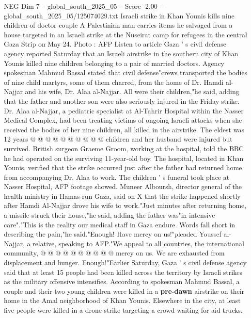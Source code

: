 \begin{textsample}{NEG Dim 7 – global\_south\_2025\_05 – Score -2.00 – global\_south\_2025\_05/125074029.txt}  \label{ex:f7_neg_006}
Israeli strike in Khan Younis kills nine children of doctor couple A Palestinian man carries items he salvaged from a house targeted in an Israeli strike at the Nuseirat camp for refugees in the central Gaza Strip on May 24.
Photo : AFP Listen to article Gaza ' s civil defense agency reported Saturday that an Israeli airstrike in the southern city of Khan Younis killed nine children belonging to a pair of married doctors.
Agency spokesman Mahmud Bassal stated that civil defense"crews transported the bodies of nine child martyrs, some of them charred, from the home of Dr.
Hamdi al-Najjar and his wife, Dr.
Alaa al-Najjar.
All were their children,"he said, adding that the father and another son were also seriously injured in the Friday strike.
Dr.
Alaa al-Najjar, a pediatric specialist at Al-Tahrir Hospital within the Nasser Medical Complex, had been treating victims of ongoing Israeli attacks when she received the bodies of her nine children, all killed in the airstrike.
The eldest was 12 years @ @ @ @ @ @ @ @ @ @ children and her husband were injured but survived.
British surgeon Graeme Groom, working at the hospital, told the BBC he had operated on the surviving 11-year-old boy.
The hospital, located in Khan Younis, verified that the strike occurred just after the father had returned home from accompanying Dr.
Alaa to work.
The children ' s funeral took place at Nasser Hospital, AFP footage showed.
Muneer Alboursh, director general of the health ministry in Hamas-run Gaza, said on X that the strike happened shortly after Hamdi Al-Najjar drove his wife to work."Just minutes after returning home, a missile struck their house,"he said, adding the father was"in intensive care"."This is the reality our medical staff in Gaza endure.
Words fall short in describing the pain,"he said."Enough!
Have mercy on us!"pleaded Youssef al-Najjar, a relative, speaking to AFP."We appeal to all countries, the international community, @ @ @ @ @ @ @ @ @ @ mercy on us.
We are exhausted from displacement and hunger.
Enough!"Earlier Saturday, Gaza ' s civil defense agency said that at least 15 people had been killed across the territory by Israeli strikes as the military offensive intensifies.
According to spokesman Mahmud Bassal, a couple and their two young children were killed in a \textbf{pre-dawn} airstrike on their home in the Amal neighborhood of Khan Younis.
Elsewhere in the city, at least five people were killed in a drone strike targeting a crowd waiting for aid trucks.

\end{textsample}
